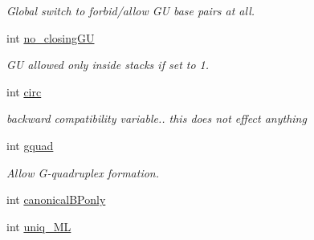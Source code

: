 \begin{DoxyCompactItemize}
\begin{DoxyCompactList}\small\item\em Global switch to forbid/allow GU base pairs at all. \end{DoxyCompactList}\item 
int \hyperlink{group__model__details_gaa8d1c7b92489179e1eafa562b7bdd259}{no\+\_\+closing\+GU}\hypertarget{group__model__details_gaa8d1c7b92489179e1eafa562b7bdd259}{}\label{group__model__details_gaa8d1c7b92489179e1eafa562b7bdd259}

\begin{DoxyCompactList}\small\item\em GU allowed only inside stacks if set to 1. \end{DoxyCompactList}\item 
int \hyperlink{group__model__details_gaf9202a1a09f5828dc731e2d9a10fa111}{circ}\hypertarget{group__model__details_gaf9202a1a09f5828dc731e2d9a10fa111}{}\label{group__model__details_gaf9202a1a09f5828dc731e2d9a10fa111}

\begin{DoxyCompactList}\small\item\em backward compatibility variable.. this does not effect anything \end{DoxyCompactList}\item 
int \hyperlink{group__model__details_ga25f2bdcdf56e813d288845484a13d704}{gquad}\hypertarget{group__model__details_ga25f2bdcdf56e813d288845484a13d704}{}\label{group__model__details_ga25f2bdcdf56e813d288845484a13d704}

\begin{DoxyCompactList}\small\item\em Allow G-\/quadruplex formation. \end{DoxyCompactList}\item 
int \hyperlink{group__model__details_ga22ae821b8918930e20ffa3fa84802b4b}{canonical\+B\+Ponly}
\item 
int \hyperlink{group__model__details_ga6c5655c8b272e3e6cab74dd0f540294f}{uniq\+\_\+\+ML}\hypertarget{group__model__details_ga6c5655c8b272e3e6cab74dd0f540294f}{}\label{group__model__details_ga6c5655c8b272e3e6cab74dd0f540294f}


\end{DoxyCompactItemize}
